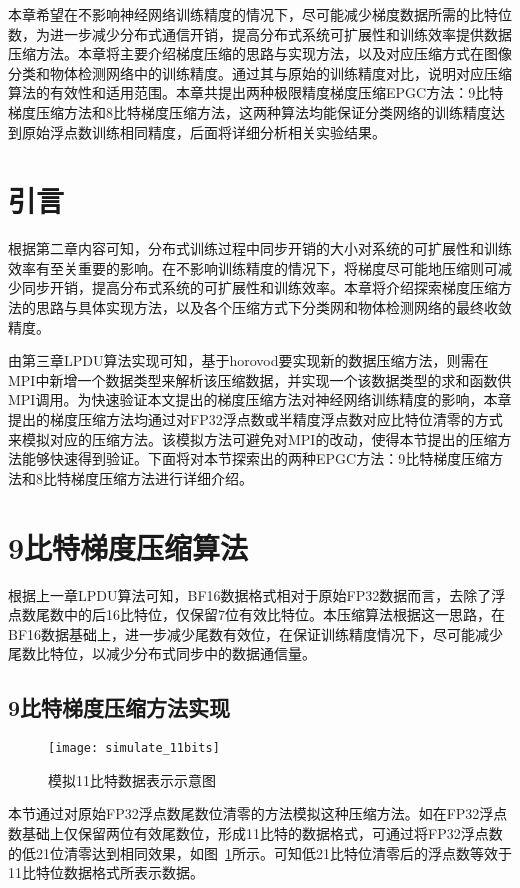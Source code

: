 本章希望在不影响神经网络训练精度的情况下，尽可能减少梯度数据所需的比特位数，为进一步减少分布式通信开销，提高分布式系统可扩展性和训练效率提供数据压缩方法。本章将主要介绍梯度压缩的思路与实现方法，以及对应压缩方式在图像分类和物体检测网络中的训练精度。通过其与原始的训练精度对比，说明对应压缩算法的有效性和适用范围。本章共提出两种极限精度梯度压缩EPGC方法：9比特梯度压缩方法和8比特梯度压缩方法，这两种算法均能保证分类网络的训练精度达到原始浮点数训练相同精度，后面将详细分析相关实验结果。
\section{引言}
根据第二章内容可知，分布式训练过程中同步开销的大小对系统的可扩展性和训练效率有至关重要的影响。在不影响训练精度的情况下，将梯度尽可能地压缩则可减少同步开销，提高分布式系统的可扩展性和训练效率。本章将介绍探索梯度压缩方法的思路与具体实现方法，以及各个压缩方式下分类网和物体检测网络的最终收敛精度。

由第三章LPDU算法实现可知，基于horovod要实现新的数据压缩方法，则需在MPI中新增一个数据类型来解析该压缩数据，并实现一个该数据类型的求和函数供MPI调用。为快速验证本文提出的梯度压缩方法对神经网络训练精度的影响，本章提出的梯度压缩方法均通过对FP32浮点数或半精度浮点数对应比特位清零的方式来模拟对应的压缩方法。该模拟方法可避免对MPI的改动，使得本节提出的压缩方法能够快速得到验证。下面将对本节探索出的两种EPGC方法：9比特梯度压缩方法和8比特梯度压缩方法进行详细介绍。
\section{9比特梯度压缩算法}
根据上一章LPDU算法可知，BF16数据格式相对于原始FP32数据而言，去除了浮点数尾数中的后16比特位，仅保留7位有效比特位。本压缩算法根据这一思路，在BF16数据基础上，进一步减少尾数有效位，在保证训练精度情况下，尽可能减少尾数比特位，以减少分布式同步中的数据通信量。

\subsection{9比特梯度压缩方法实现}
\begin{figure}[htp]
\centering
\texttt{[image: simulate\_11bits]}
\caption{模拟11比特数据表示示意图}
\label{fig:simulate_11bits}
\end{figure}
本节通过对原始FP32浮点数尾数位清零的方法模拟这种压缩方法。如在FP32浮点数基础上仅保留两位有效尾数位，形成11比特的数据格式，可通过将FP32浮点数的低21位清零达到相同效果，如图~\ref{fig:simulate_11bits}所示。可知低21比特位清零后的浮点数等效于11比特位数据格式所表示数据。

